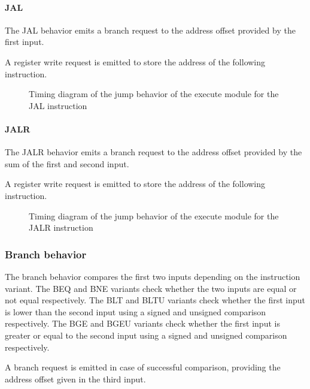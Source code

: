       \paragraph{JAL}

      \begin{content}
          The JAL behavior emits a branch request to the address offset provided by the first input.
          
          A register write request is emitted to store the address of the following instruction.
        \end{content}

      \begin{figure}[H]
          \centering
          
          \caption{Timing diagram of the jump behavior of the execute module for the JAL instruction}
          \label{fig:exm-behavior-jump-jal}
        \end{figure}

      \paragraph{JALR}

      \begin{content}
          The JALR behavior emits a branch request to the address offset provided by the sum of the first and second input.
          
          A register write request is emitted to store the address of the following instruction.
        \end{content}

      \begin{figure}[H]
          \centering
          
          \caption{Timing diagram of the jump behavior of the execute module for the JALR instruction}
          \label{fig:exm-behavior-jump-jalr}
        \end{figure}

    \subsubsection{Branch behavior}

      \begin{content}
          The branch behavior compares the first two inputs depending on the instruction variant. The BEQ and BNE variants check whether the two inputs are equal or not equal respectively. The BLT and BLTU variants check whether the first input is lower than the second input using a signed and unsigned comparison respectively. The BGE and BGEU variants check whether the first input is greater or equal to the second input using a signed and unsigned comparison respectively.
          
          A branch request is emitted in case of successful comparison, providing the address offset given in the third input.
        \end{content}

